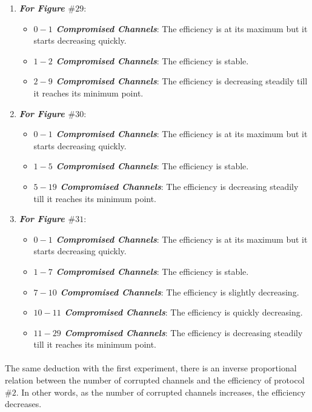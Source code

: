 \documentclass[main.tex]{subfiles}
\begin{document}
\begin{enumerate}
\item \textbf{\textit{For Figure $\#29$}}:
\begin{itemize}
\item \textbf{\textit{$0 - 1$ Compromised Channels}}: The efficiency is at its maximum but it starts decreasing quickly.\item \textbf{\textit{$1 - 2$ Compromised Channels}}: The efficiency is stable.
\item \textbf{\textit{$2 - 9$ Compromised Channels}}: The efficiency is decreasing steadily till it reaches its minimum point.
\end{itemize}
\item \textbf{\textit{For Figure $\#30$}}:
\begin{itemize}
\item \textbf{\textit{$0 - 1$ Compromised Channels}}: The efficiency is at its maximum but it starts decreasing quickly.\item \textbf{\textit{$1 - 5$ Compromised Channels}}: The efficiency is stable.
\item \textbf{\textit{$5 - 19$ Compromised Channels}}: The efficiency is decreasing steadily till it reaches its minimum point.
\end{itemize}
\item \textbf{\textit{For Figure $\#31$}}:
\begin{itemize}
\item \textbf{\textit{$0 - 1$ Compromised Channels}}: The efficiency is at its maximum but it starts decreasing quickly.\item \textbf{\textit{$1 - 7$ Compromised Channels}}: The efficiency is stable.
\item \textbf{\textit{$7 - 10$ Compromised Channels}}: The efficiency is slightly decreasing.
\item \textbf{\textit{$10 - 11$ Compromised Channels}}: The efficiency is quickly decreasing.
\item \textbf{\textit{$11 - 29$ Compromised Channels}}: The efficiency is decreasing steadily till it reaches its minimum point.
\end{itemize}
\end{enumerate}
\paragraph{}
The same deduction with the first experiment, there is an inverse proportional relation between the number of corrupted channels and the efficiency of protocol $\#2$. In other words, as the number of corrupted channels increases, the efficiency decreases.
\end{document}

